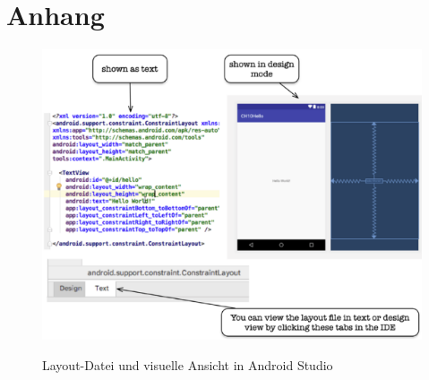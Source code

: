 \section*{Anhang}

\anhangsverzeichnis


\begin{figure}[hbt]
    \centering
    \begin{minipage}[t]{.95\textwidth}
        \caption[]{Layout-Datei und visuelle Ansicht in Android Studio}
        \includegraphics[width=1\textwidth]{img/Android_Studio_Layout_Editor.PNG}\\
        \label{fig:android_studio_layout_editor}
    \end{minipage}
\end{figure}

